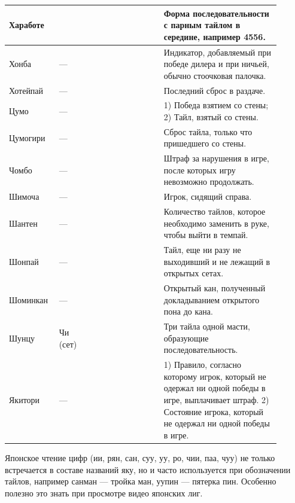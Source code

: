\begin{tabularx}{\linewidth}{L{0.14\linewidth}L{0.13\linewidth}L{0.1\linewidth}L{0.13\linewidth}L{0.4\linewidth}}
	\midrule
	Хаработе & & & & Форма последовательности с парным тайлом в середине, например 4556. \\
	\midrule
	Хонба & --- &  &  & Индикатор, добавляемый при победе дилера и при ничьей, обычно стоочковая палочка. \\
	\midrule
	Хотейпай & --- &  &  & Последний сброс в раздаче. \\
	\midrule
	Цумо & --- &  &  & 1) Победа взятием со стены; 2) Тайл, взятый со стены. \\
	\midrule
	Цумогири & --- &  &  & Сброс тайла, только что пришедшего со стены. \\
	\midrule
	Чомбо & --- &  &  & Штраф за нарушения в игре, после которых игру невозможно продолжать. \\
	\midrule
	Шимоча & --- &  &  & Игрок, сидящий справа. \\
	\midrule
	Шантен & --- &  &  & Количество тайлов, которое необходимо заменить в руке, чтобы выйти в темпай. \\
	\midrule
	Шонпай & --- &  &  & Тайл, еще ни разу не выходивший и не лежащий в открытых сетах. \\
	\midrule
	Шоминкан & --- &  &   & Открытый кан, полученный докладыванием открытого пона до кана. \\
	\midrule
	Шунцу & Чи (сет) &  &  & Три тайла одной масти, образующие последовательность. \\
	\midrule
	Якитори & --- &  &  & 1) Правило, согласно которому игрок, который не одержал ни одной победы в игре, выплачивает штраф. 2) Состояние игрока, который не одержал ни одной победы в игре. \\
\end{tabularx}

Японское чтение цифр (ии, рян, сан, суу, уу, ро, чии, паа, чуу) не только встречается в составе названий яку, но и часто используется при обозначении тайлов, например санман --- тройка ман, уупин --- пятерка пин. Особенно полезно это знать при просмотре видео японских лиг.


